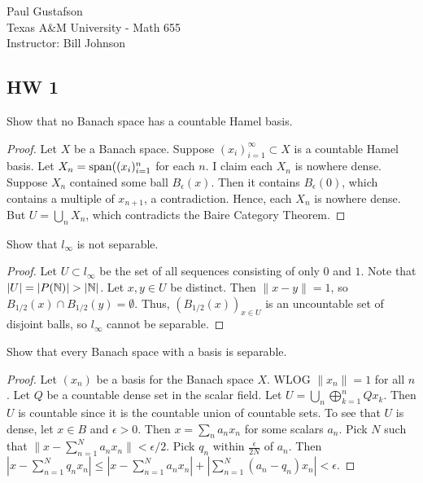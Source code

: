 \documentclass{article}
\begin{document}
\noindent Paul Gustafson\\
\noindent Texas A\&M University - Math 655\\ 
\noindent Instructor: Bill Johnson

\subsection*{HW 1}
 Show that no Banach space has a countable Hamel basis.
\begin{proof}
Let $X$ be a Banach space.  Suppose $(x_i)_{i=1}^\infty \subset X$ is a countable Hamel basis.  Let $X_n = \operatorname{span}((x_i)_{i=1}^n$ for each $n$.  I claim each $X_n$ is nowhere dense. Suppose $X_n$ contained some ball $B_\epsilon(x)$. Then it contains $B_\epsilon(0)$, which contains a multiple of $x_{n+1}$, a contradiction.  Hence, each $X_n$ is nowhere dense.  But $U = \bigcup_n X_n$, which contradicts the Baire Category Theorem.
\end{proof}


 Show that $l_\infty$ is not separable.
\begin{proof}
Let $U \subset l_\infty$ be the set of all sequences consisting of only $0$ and $1$.  Note that $|U| = |P(\mathbb{N})| > |\mathbb{N}| $.  Let $x,y \in U$ be distinct. Then $\|x - y \| = 1$, so $B_{1/2}(x) \cap B_{1/2}(y) = \emptyset$.  Thus, $(B_{1/2}(x))_{x\in U}$ is an uncountable set of disjoint balls, so $l_\infty$ cannot be separable.
\end{proof}


 Show that every Banach space with a basis is separable.
\begin{proof}
Let $(x_n)$ be a basis for the Banach space $X$. WLOG $\|x_n\| = 1$ for all $n$. Let $Q$ be a countable dense set in the scalar field.  Let $U = \bigcup_n \bigoplus_{k=1}^n Q x_k$. Then $U$ is countable since it is the countable union of countable sets.  To see that $U$ is dense, let $x \in B$ and $\epsilon > 0$. Then $x = \sum_n a_n x_n$ for some scalars $a_n$. Pick $N$ such that $\|x - \sum_{n=1}^N a_n x_n\| < \epsilon/2$.  Pick $q_n$ within $\frac \epsilon {2N}$  of $a_n$.  Then $ |x - \sum_{n=1}^N q_n x_n| \le |x - \sum_{n=1}^N a_n x_n| + |\sum_{n=1}^N (a_n - q_n)x_n| < \epsilon$.
\end{proof}
\end{document}
